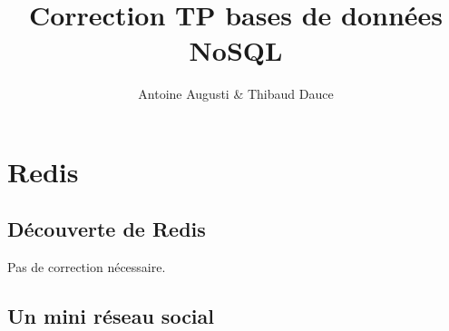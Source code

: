 \documentclass[a4paper,10pt]{article}
\title{Correction TP bases de données NoSQL}
\date{}
\author{Antoine Augusti \& Thibaud Dauce}
\begin{document}
\maketitle
\sloppy

\section{Redis}
  \subsection{Découverte de Redis}
    Pas de correction nécessaire.

  \subsection{Un mini réseau social}
\end{document}
